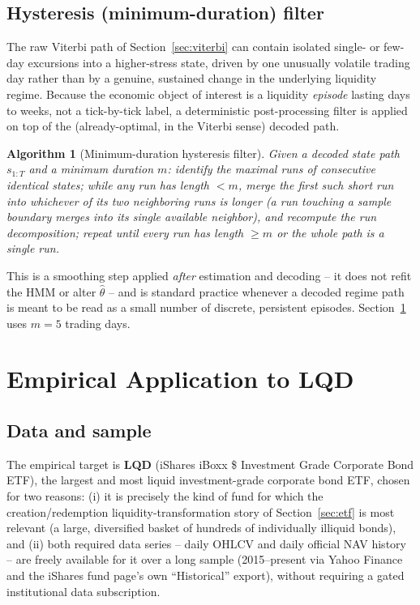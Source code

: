 \documentclass[11pt]{article}
\newtheorem{algorithm}[theorem]{Algorithm}
\theoremstyle{definition}
\theoremstyle{remark}
\begin{document}
\subsection{Hysteresis (minimum-duration) filter}
\label{sec:hysteresis}

The raw Viterbi path of Section~\ref{sec:viterbi} can contain isolated single- or few-day excursions into a higher-stress state, driven by one unusually volatile trading day rather than by a genuine, sustained change in the underlying liquidity regime. Because the economic object of interest is a liquidity \emph{episode} lasting days to weeks, not a tick-by-tick label, a deterministic post-processing filter is applied on top of the (already-optimal, in the Viterbi sense) decoded path.

\begin{algorithm}[Minimum-duration hysteresis filter]
\label{alg:hysteresis}
Given a decoded state path $s_{1:T}$ and a minimum duration $m$: identify the maximal runs of consecutive identical states; while any run has length $<m$, merge the \emph{first} such short run into whichever of its two neighboring runs is longer (a run touching a sample boundary merges into its single available neighbor), and recompute the run decomposition; repeat until every run has length $\ge m$ or the whole path is a single run.
\end{algorithm}
This is a smoothing step applied \emph{after} estimation and decoding -- it does not refit the HMM or alter $\widehat\theta$ -- and is standard practice whenever a decoded regime path is meant to be read as a small number of discrete, persistent episodes. Section~\ref{sec:empirical} uses $m=5$ trading days.

\section{Empirical Application to LQD}
\label{sec:empirical}

\subsection{Data and sample}

The empirical target is \textbf{LQD} (iShares iBoxx \$ Investment Grade Corporate Bond ETF), the largest and most liquid investment-grade corporate bond ETF, chosen for two reasons: (i) it is precisely the kind of fund for which the creation/redemption liquidity-transformation story of Section~\ref{sec:etf} is most relevant (a large, diversified basket of hundreds of individually illiquid bonds), and (ii) both required data series -- daily OHLCV and daily official NAV history -- are freely available for it over a long sample (2015--present via Yahoo Finance and the iShares fund page's own ``Historical'' export), without requiring a gated institutional data subscription.
\end{document}
